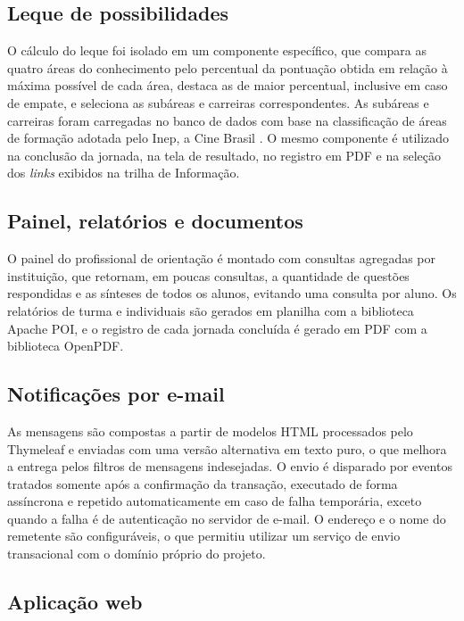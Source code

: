 \subsection{Leque de possibilidades}

O cálculo do leque foi isolado em um componente específico, que compara as quatro áreas do conhecimento pelo percentual da pontuação obtida em relação à máxima possível de cada área, destaca as de maior percentual, inclusive em caso de empate, e seleciona as subáreas e carreiras correspondentes. As subáreas e carreiras foram carregadas no banco de dados com base na classificação de áreas de formação adotada pelo Inep, a Cine Brasil \cite{inep2019cine}. O mesmo componente é utilizado na conclusão da jornada, na tela de resultado, no registro em PDF e na seleção dos \textit{links} exibidos na trilha de Informação.

\subsection{Painel, relatórios e documentos}

O painel do profissional de orientação é montado com consultas agregadas por instituição, que retornam, em poucas consultas, a quantidade de questões respondidas e as sínteses de todos os alunos, evitando uma consulta por aluno. Os relatórios de turma e individuais são gerados em planilha com a biblioteca Apache POI, e o registro de cada jornada concluída é gerado em PDF com a biblioteca OpenPDF.

\subsection{Notificações por e-mail}

As mensagens são compostas a partir de modelos HTML processados pelo Thymeleaf e enviadas com uma versão alternativa em texto puro, o que melhora a entrega pelos filtros de mensagens indesejadas. O envio é disparado por eventos tratados somente após a confirmação da transação, executado de forma assíncrona e repetido automaticamente em caso de falha temporária, exceto quando a falha é de autenticação no servidor de e-mail. O endereço e o nome do remetente são configuráveis, o que permitiu utilizar um serviço de envio transacional com o domínio próprio do projeto.

\subsection{Aplicação web}

